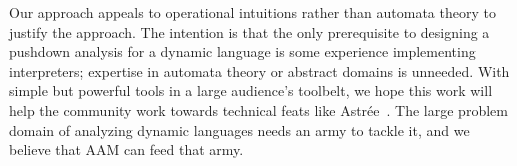 Our approach appeals to operational intuitions rather than automata theory to justify the approach.
%
The intention is that the only prerequisite to designing a pushdown
analysis for a dynamic language is some experience implementing
interpreters; expertise in automata theory or abstract domains is
unneeded.
%
With simple but powerful tools in a large audience's toolbelt, we hope this work will help the community work towards technical feats like Astr\'ee~\citep{ianjohnson:CousotEtAl-TASE07}.
%
The large problem domain of analyzing dynamic languages needs an army to tackle it, and we believe that AAM can feed that army.
